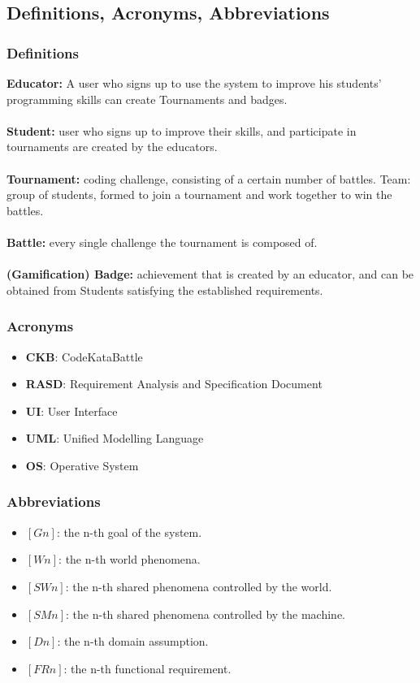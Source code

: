 \documentclass{article}
\begin{document}
\subsection{Definitions, Acronyms, Abbreviations}
\subsubsection{Definitions}
\textbf{Educator:} A user who signs up to use the system to improve his students' programming skills can create Tournaments and badges. \\\\
\textbf{Student:} user who signs up to improve their skills, and participate in tournaments are created by the educators. \\\\
\textbf{Tournament:} coding challenge, consisting of a certain number of battles. Team: group of students, formed to join a tournament and work together to win the battles. \\\\
\textbf{Battle:} every single challenge the tournament is composed of. \\\\
\textbf{(Gamification) Badge:} achievement that is created by an educator, and can be obtained from Students satisfying the established requirements.\\

\subsubsection{Acronyms}
\begin{itemize}
    \item \textbf{CKB}: CodeKataBattle
    \item \textbf{RASD}: Requirement Analysis and Specification Document
    \item \textbf{UI}: User Interface
    \item \textbf{UML}: Unified Modelling Language
    \item \textbf{OS}: Operative System
\end{itemize}

\subsubsection{Abbreviations}
\begin{itemize}
    \item \textbf{$[Gn]$}: the n-th goal of the system.
    \item \textbf{$[Wn]$}: the n-th world phenomena.
    \item \textbf{$[SWn]$}: the n-th shared phenomena controlled by the world.
    \item \textbf{$[SMn]$}: the n-th shared phenomena controlled by the machine.
    \item \textbf{$[Dn]$}: the n-th domain assumption.
    \item \textbf{$[FRn]$}: the n-th functional requirement.
\end{itemize}
\end{document}

